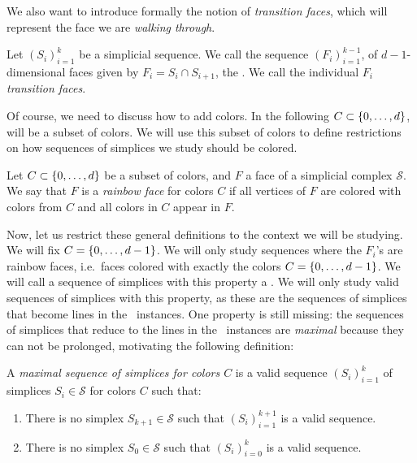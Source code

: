 We also want to introduce formally the notion of \emph{transition faces}, which will represent the face we are \emph{walking through}.

\begin{definition}
	\label{def:transition_faces}
	Let $\left(S_i\right)_{i=1}^{k}$ be a simplicial sequence. We call the sequence $\left(F_i\right)_{i=1}^{k-1}$, of $d-1$-dimensional faces given by $F_i = S_i \cap S_{i+1}$, the . We call the individual $F_i$ \emph{transition faces}.
\end{definition}

Of course, we need to discuss how to add colors. In the following $C \subset \left\{0, \dots, d\right\}$, will be a subset of colors. We will use this subset of colors to define restrictions on how sequences of simplices we study should be colored.

\begin{definition}
	Let $C \subset \left\{0, \dots, d\right\}$ be a subset of colors, and $F$ a face of a simplicial complex $\mathcal{S}$. We say that $F$ is a \emph{rainbow face} for colors $C$ if all vertices of $F$ are colored with colors from $C$ and all colors in $C$ appear in $F$.
\end{definition}

Now, let us restrict these general definitions to the context we will be studying. We will fix $C = \left\{0, \dots, d-1\right\}$.  We will only study sequences where the $F_i$'s are rainbow faces, i.e.~faces colored with exactly the colors $C = \left\{0, \dots, d-1\right\}$. We will call a sequence of simplices with this property a . We will only study valid sequences of simplices with this property, as these are the sequences of simplices that become lines in the \EndOfLine\ instances. One property is still missing: the sequences of simplices that reduce to the lines in the \EndOfLine\ instances are \emph{maximal} because they can not be prolonged, motivating the following definition:

\begin{definition}
	A \emph{maximal sequence of simplices for colors $C$} is a valid sequence $\left(S_i\right)_{i=1}^{k}$ of simplices $S_i \in \mathcal{S}$ for colors $C$ such that:
	\begin{enumerate}
		\item There is no simplex $S_{k+1} \in \mathcal{S}$ such that $\left(S_i\right)_{i=1}^{k+1}$ is a valid sequence.
		\item There is no simplex $S_{0} \in \mathcal{S}$ such that $\left(S_i\right)_{i=0}^{k}$ is a valid sequence.
	\end{enumerate}
\end{definition}

